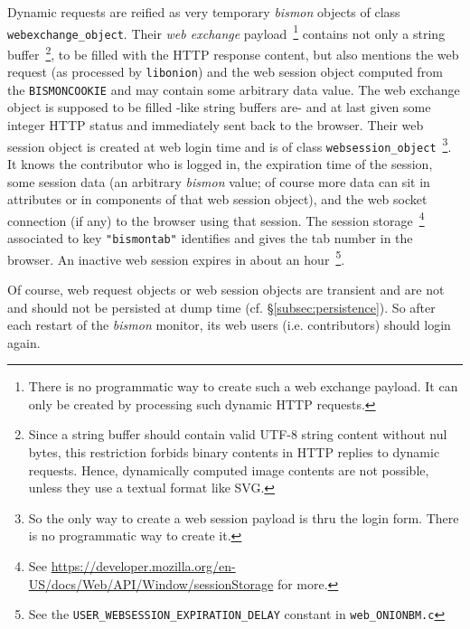 Dynamic requests are reified as very temporary \emph{bismon} objects
of class \texttt{webexchange\_object}. Their \emph{web exchange}
payload~\footnote{There is no programmatic way to create such a web
  exchange payload. It can only be created by processing such dynamic
  HTTP requests.} contains not only a string buffer~\footnote{Since a
  string buffer should contain valid UTF-8 string content without nul
  bytes, this restriction forbids binary contents in HTTP replies to
  dynamic requests. Hence, dynamically computed image contents are not
  possible, unless they use a textual format like SVG.}, to be filled
with the HTTP response content, but also mentions the web request (as
processed by \texttt{libonion}) and the web session object computed
from the \texttt{BISMONCOOKIE} and may contain some arbitrary data
value. The web exchange object is supposed to be filled -like string
buffers are- and at last given some integer HTTP status and
immediately sent back to the browser.  Their web session object is
created at web login time and is of class
\texttt{websession\_object}~\footnote{So the only way to create a web
  session payload is thru the login form. There is no programmatic way
  to create it.}. It knows the contributor who is logged in, the
expiration time of the session, some session data (an arbitrary
\emph{bismon} value; of course more data can sit in attributes or in
components of that web session object), and the web socket  connection (if any) to the browser using that session. The
session storage~\footnote{See
  \url{https://developer.mozilla.org/en-US/docs/Web/API/Window/sessionStorage}
  for more.} associated to key \texttt{"bismontab"} identifies and
gives the tab number in the browser. An inactive web session expires
in about an hour~\footnote{See the
  \texttt{USER\_WEBSESSION\_EXPIRATION\_DELAY} constant in
  \texttt{web\_ONIONBM.c}}.

Of course, web request objects or web session objects are
 transient and are not and should not be persisted at
dump  time (cf. §\ref{subsec:persistence}). So after each
restart of the \emph{bismon} monitor, its web users
(i.e. contributors) should login  again.

